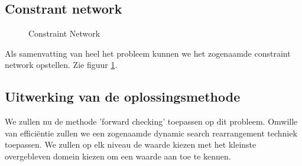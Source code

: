 \documentclass[alternative-exam.tex]{subfiles}
\begin{document}
\subsection{Constrant network}
\begin{figure}[H]
\caption{Constraint Network}
\label{fig:fourTeachersConstraintNetwork}
\centering
{}
\end{figure}
Als samenvatting van heel het probleem kunnen we het zogenaamde constraint network opstellen. Zie figuur \ref{fig:fourTeachersConstraintNetwork}.

\subsection{Uitwerking van de oplossingsmethode}
We zullen nu de methode 'forward checking' toepassen op dit probleem. Omwille van effici\"entie zullen we een zogenaamde dynamic search rearrangement techniek toepassen. We zullen op elk niveau de waarde kiezen met het kleinste overgebleven domein kiezen om een waarde aan toe te kennen.
\end{document}

